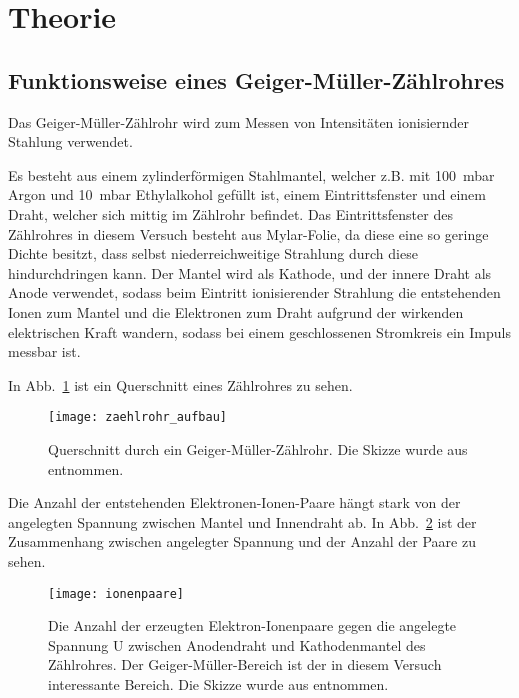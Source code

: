 
\section{Theorie}
\subsection{Funktionsweise eines Geiger-Müller-Zählrohres}
%
Das Geiger-Müller-Zählrohr wird zum Messen von Intensitäten ionisiernder Stahlung
verwendet.

Es besteht aus einem zylinderförmigen Stahlmantel, welcher z.B. mit \SI{100}{\milli\bar} Argon
und \SI{10}{\milli\bar} Ethylalkohol gefüllt ist, einem Eintrittsfenster und einem Draht, welcher sich 
mittig im Zählrohr befindet. Das Eintrittsfenster des Zählrohres in diesem Versuch besteht aus
Mylar-Folie, da diese eine so geringe Dichte besitzt, dass selbst niederreichweitige Strahlung
durch diese hindurchdringen kann.
Der Mantel wird als Kathode, und der innere Draht als Anode verwendet, sodass beim Eintritt ionisierender
Strahlung die entstehenden Ionen zum Mantel und die Elektronen zum Draht aufgrund der wirkenden
elektrischen Kraft wandern, sodass bei einem geschlossenen Stromkreis ein Impuls messbar ist.

In Abb.~\ref{fig:zaehlrohr_aufbau} ist ein Querschnitt eines Zählrohres zu sehen.
%
\begin{figure}
  \centering
  \texttt{[image: zaehlrohr\_aufbau]}
  \caption{Querschnitt durch ein Geiger-Müller-Zählrohr.
               Die Skizze wurde aus \textcite{v703} entnommen.}
  \label{fig:zaehlrohr_aufbau}
\end{figure}
%

Die Anzahl der entstehenden Elektronen-Ionen-Paare hängt stark von der angelegten Spannung zwischen
Mantel und Innendraht ab.
In Abb.~\ref{fig:ionenpaare} ist der Zusammenhang zwischen angelegter Spannung und der Anzahl der
Paare zu sehen.
%
\begin{figure}[h]
  \centering
  \texttt{[image: ionenpaare]}
  \caption{Die Anzahl der erzeugten Elektron-Ionenpaare 
               gegen die angelegte Spannung U zwischen Anodendraht
               und Kathodenmantel des Zählrohres. Der Geiger-Müller-Bereich 
                ist der in diesem Versuch interessante Bereich.
                 Die Skizze wurde aus \textcite{v703} entnommen.}
  \label{fig:ionenpaare}
\end{figure}
